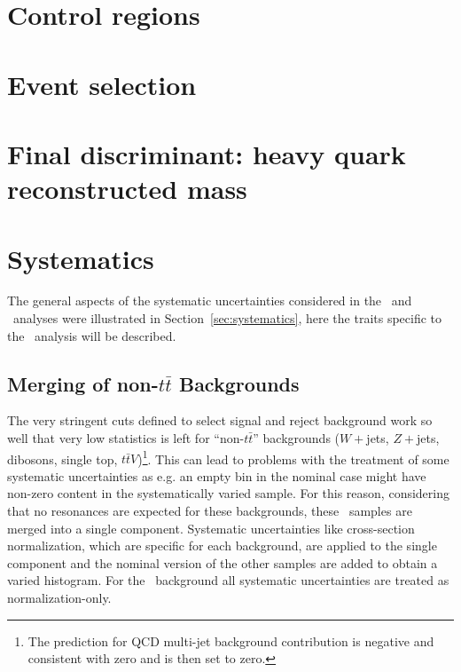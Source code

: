 \section{Control regions}\label{sec:wbxCR}

\section{Event selection}\label{sec:wbxEVT}

\section{Final discriminant: heavy quark reconstructed mass}\label{sec:wbxDISCR}


\section{Systematics}\label{sec:wbxSYS}

The general aspects of the systematic uncertainties considered
in the \wbx\ and \htx\ analyses were illustrated
in Section~\ref{sec:systematics}, here the traits specific to the
\wbx\ analysis will be described.

\subsection{Merging of non-$t\bar{t}$ Backgrounds}

The very stringent cuts defined to select signal and reject
background work so well that very low statistics is left for
``non-$t\bar{t}$'' backgrounds ($W+$jets, $Z+$jets, dibosons, single top, 
$t\bar{t}V$)\footnote{The prediction for QCD multi-jet background contribution
is negative and consistent with zero and is then set to zero.}.
This can lead to problems with the treatment of some systematic uncertainties as
e.g. an empty bin in the nominal case might have non-zero content in the
systematically varied sample. For this reason, considering that no resonances
are expected for these backgrounds, these \nontt\ samples are merged into
a single component. Systematic uncertainties like cross-section normalization,
which are specific for each background, are applied to the single component
and the nominal version of the other samples are added to obtain
a varied histogram.
For the \nontt\ background all systematic uncertainties are
treated as normalization-only.

